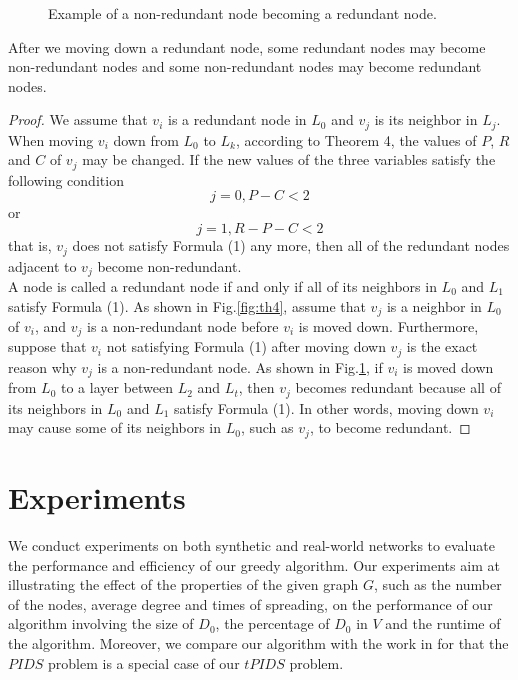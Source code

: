 \begin{figure}[!htb]
	\centering
	\caption{Example of a non-redundant node becoming a redundant node.}
	\label{fig:th5}
\end{figure}

\begin{theorem}
	After we moving down a redundant node, some redundant nodes may become non-redundant nodes and some non-redundant nodes may become redundant nodes.
\end{theorem}
\begin{proof}
We assume that $v_i$ is a redundant node in $L_0$ and $v_j$ is its neighbor in $L_j$. When moving $v_i$ down from $L_0$ to $L_k$, according to Theorem 4, the values of $P$, $R$ and $C$ of $v_j$ may be changed. If the new values of the three variables satisfy the following condition
	\[ j=0, P-C<2 \]
	or
	\[ j=1, R-P-C<2 \]
that is, $v_j$ does not satisfy Formula (1) any more, then all of the redundant nodes adjacent to $v_j$ become non-redundant.\\
A node is called a redundant node if and only if all of its neighbors in $L_0$ and $L_1$ satisfy Formula (1). As shown in Fig.\ref{fig:th4}, assume that $v_j$ is a neighbor in $L_0$ of $v_i$, and $v_j$ is a non-redundant node before $v_i$ is moved down. Furthermore, suppose that $v_i$ not satisfying Formula (1) after moving down $v_j$ is the exact reason why $v_j$ is a non-redundant node. As shown in Fig.\ref{fig:th5}, if $v_i$ is moved down from $L_0$ to a layer between $L_2$ and $L_t$, then $v_j$ becomes redundant because all of its neighbors in $L_0$ and $L_1$ satisfy Formula (1). In other words, moving down $v_i$ may cause some of its neighbors in $L_0$, such as $v_j$, to become redundant.
	
\end{proof}

\section{Experiments}
We conduct experiments on both synthetic and real-world networks to evaluate the performance and efficiency of our greedy algorithm. Our experiments aim at illustrating the effect of the properties of the given graph $G$, such as the number of the nodes, average degree and times of spreading, on the performance of our algorithm involving the size of $D_0$, the percentage of $D_0$ in $V$ and the runtime of the algorithm. Moreover, we compare our algorithm with the work in \cite{WDC2011} for that the $PIDS$ problem is a special case of our $tPIDS$ problem.

